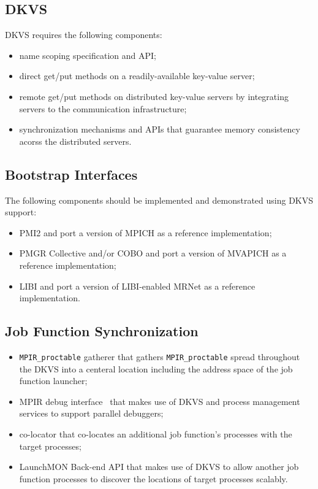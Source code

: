 \documentclass[10pt]{article}
\begin{document}
\subsection{DKVS}
DKVS requires the following components:  
\begin{itemize}
\item{name scoping specification and API;}
\item{direct get/put methods on a readily-available key-value server;}
\item{remote get/put methods on distributed key-value servers by 
integrating servers to the communication infrastructure;} 
\item{synchronization mechanisms and APIs that guarantee memory consistency 
acorss the distributed servers.} 
\end{itemize}

\subsection{Bootstrap Interfaces}
The following components should be implemented and demonstrated
using DKVS support:
\begin{itemize}
\item{PMI2 and port a version of MPICH as a reference implementation;}
\item{PMGR Collective and/or COBO and port a version of MVAPICH as a reference implementation;}
\item{LIBI and port a version of LIBI-enabled MRNet as a reference implementation.}
\end{itemize}

\subsection{Job Function Synchronization}
\begin{itemize}
\item{{\tt MPIR\_proctable} gatherer that gathers {\tt MPIR\_proctable} spread throughout the
DKVS into a centeral location including the address space of the job function launcher;}
\item{MPIR debug interface~\cite{MPIRInterface} that makes use of DKVS and process
management services to support parallel debuggers;}
\item{co-locator that co-locates an additional job function's processes with
the target processes;}
\item{LaunchMON Back-end API that makes use of DKVS to allow another job function processes 
to discover the locations of target processes scalably.}
\end{itemize}
\end{document}
